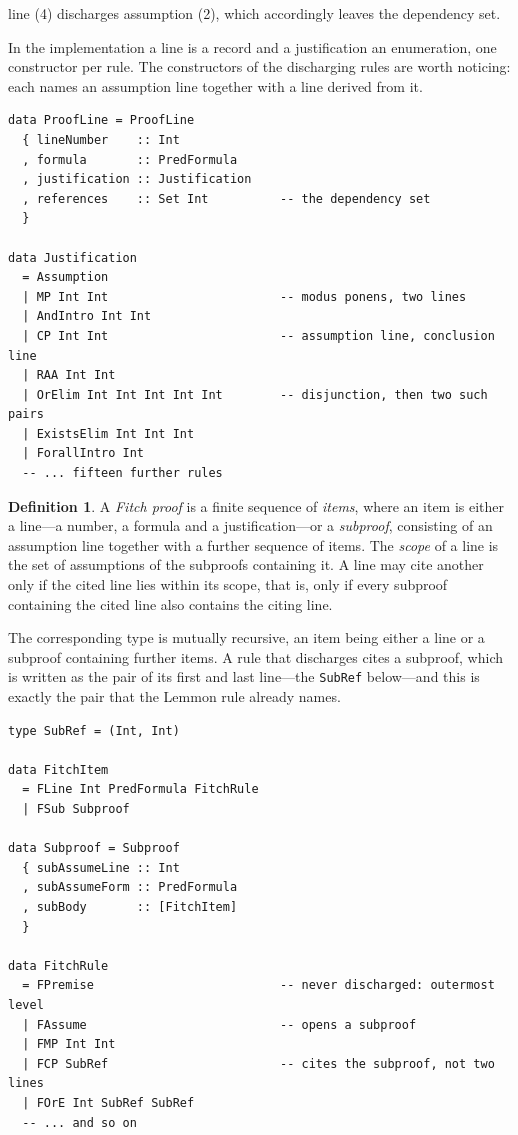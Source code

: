 \documentclass[11pt]{article}
\theoremstyle{plain}
\theoremstyle{definition}
\newtheorem{definition}[theorem]{Definition}
\theoremstyle{remark}
\begin{document}
\noindent line (4) discharges assumption (2), which accordingly leaves the
dependency set.

In the implementation a line is a record and a justification an enumeration,
one constructor per rule. The constructors of the discharging rules are worth
noticing: each names an assumption line together with a line derived from it.

\begin{lstlisting}
data ProofLine = ProofLine
  { lineNumber    :: Int
  , formula       :: PredFormula
  , justification :: Justification
  , references    :: Set Int          -- the dependency set
  }

data Justification
  = Assumption
  | MP Int Int                        -- modus ponens, two lines
  | AndIntro Int Int
  | CP Int Int                        -- assumption line, conclusion line
  | RAA Int Int
  | OrElim Int Int Int Int Int        -- disjunction, then two such pairs
  | ExistsElim Int Int Int
  | ForallIntro Int
  -- ... fifteen further rules
\end{lstlisting}

\begin{definition}\label{def:fitch}
A \emph{Fitch proof} is a finite sequence of \emph{items}, where an item is
either a line---a number, a formula and a justification---or a
\emph{subproof}, consisting of an assumption line together with a further
sequence of items. The \emph{scope} of a line is the set of assumptions of the
subproofs containing it. A line may cite another only if the cited line lies
within its scope, that is, only if every subproof containing the cited line
also contains the citing line.
\end{definition}

The corresponding type is mutually recursive, an item being either a line or
a subproof containing further items. A rule that discharges cites a subproof,
which is written as the pair of its first and last line---the \verb|SubRef|
below---and this is exactly the pair that the Lemmon rule already names.

\begin{lstlisting}
type SubRef = (Int, Int)

data FitchItem
  = FLine Int PredFormula FitchRule
  | FSub Subproof

data Subproof = Subproof
  { subAssumeLine :: Int
  , subAssumeForm :: PredFormula
  , subBody       :: [FitchItem]
  }

data FitchRule
  = FPremise                          -- never discharged: outermost level
  | FAssume                           -- opens a subproof
  | FMP Int Int
  | FCP SubRef                        -- cites the subproof, not two lines
  | FOrE Int SubRef SubRef
  -- ... and so on
\end{lstlisting}
\end{document}
